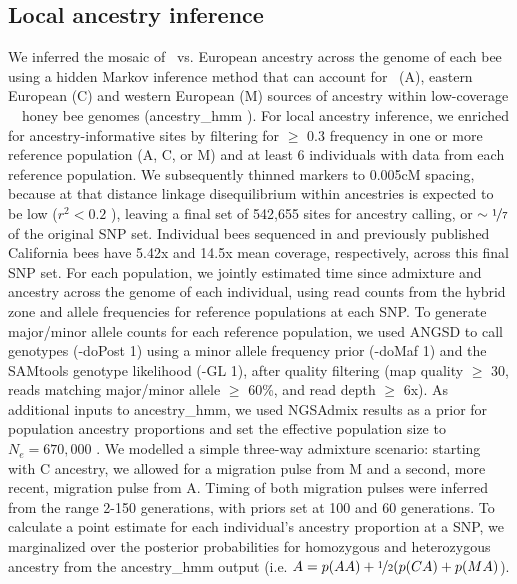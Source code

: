 \subsection*{Local ancestry inference}
We inferred the mosaic of \scutellata\ vs. European ancestry across the genome of each bee using a hidden Markov inference method that can account for \scutellata\ (A), eastern European (C) and western European (M) sources of ancestry within low-coverage \africanized\ \hyb\ honey bee genomes (ancestry\_hmm  \cite{CorbettDetig:2017gh}). For local ancestry inference, we enriched for ancestry-informative sites by filtering for $\geq$ 0.3 frequency in one or more reference population (A, C, or M) and at least 6 individuals with data from each reference population. We subsequently thinned markers to 0.005cM spacing, because at that distance linkage disequilibrium within ancestries is expected to be low ($r^{2} < 0.2$ \cite{Wallberg:2014ha}), leaving a final set of 542,655 sites for ancestry calling, or $\sim \nicefrac{1}{7}$ of the original SNP set. Individual bees sequenced in  and previously published California bees have 5.42x and 14.5x mean coverage, respectively, across this final SNP set. For each population, we jointly estimated time since admixture and ancestry across the genome of each individual, using read counts from the hybrid zone and allele frequencies for  reference populations at each SNP. To generate major/minor allele counts for each reference population, we used ANGSD to call genotypes (-doPost 1) using a minor allele frequency prior (-doMaf 1) and the SAMtools genotype likelihood (-GL 1), after quality filtering (map quality $\geq$ 30, reads matching major/minor allele $\geq$ 60\%, and read depth $\geq$ 6x). As additional inputs to ancestry\_hmm, we used NGSAdmix results as a prior for population ancestry proportions and set the effective population size to ${N_e}=670,000$ \cite{Nelson:2017cj}. We modelled a simple three-way admixture scenario: starting with C ancestry, we allowed for a migration pulse from M and a second, more recent, migration pulse from A. Timing of both migration pulses were inferred from the range 2-150 generations, with priors set at 100 and 60 generations. To calculate a point estimate for each individual's ancestry proportion at a SNP, we marginalized over the posterior probabilities for homozygous and heterozygous ancestry from the ancestry\_hmm output (i.e. $A = p(AA) + \nicefrac{1}{2}(p(CA) + p(MA)$).


